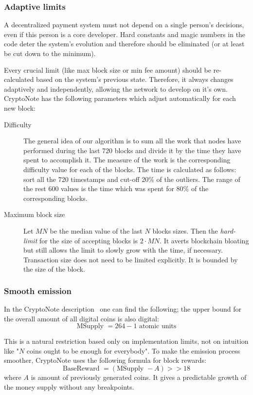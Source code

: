 \subsubsection{Adaptive limits}
A decentralized payment system must not depend on a single person's decisions, even if this person is a core developer. Hard constants and magic numbers in the code deter the system's evolution and therefore should be eliminated (or at least be cut down to the minimum).

Every crucial limit (like max block size or min fee amount) should be re-calculated based on the system's previous state. Therefore, it always changes adaptively and independently, allowing the network to develop on it's own. CryptoNote has the following parameters which adjust automatically for each new block:

\begin{description}
  \item [Difficulty] The general idea of our algorithm is to sum all the work that nodes have performed during the last 720 blocks and divide it by the time they have spent to accomplish it. The measure of the work is the corresponding difficulty value for each of the blocks. The time is calculated as follows: sort all the 720 timestamps and cut-off 20\% of the outliers. The range of the rest 600 values is the time which was spent for 80\% of the corresponding blocks.
  \item [Maximum block size] Let $MN$ be the median value of the last $N$ blocks sizes. Then the \emph{hard-limit} for the size of accepting blocks is $2 \cdot MN$. It averts blockchain bloating but still allows the limit to slowly grow with the time, if necessary. Transaction size does not need to be limited explicitly. It is bounded by the size of the block.
\end{description}

\subsubsection{Smooth emission}
In the CryptoNote description~\cite{cryptonote} one can find the following; the upper bound for the overall amount of all digital coins is also digital:
\begin{equation}
  \mbox{MSupply } = 264 − 1 \mbox{ atomic units}
\end{equation}

This is a natural restriction based only on implementation limits, not on intuition like "$N$ coins ought to be enough for everybody". To make the emission process smoother, CryptoNote uses the following formula for block rewards:
\begin{equation}
  \mbox{BaseReward } = (\mbox{MSupply } - A) >> 18
\end{equation}
where $A$ is amount of previously generated coins. It gives a predictable growth of the money supply without any breakpoints.

